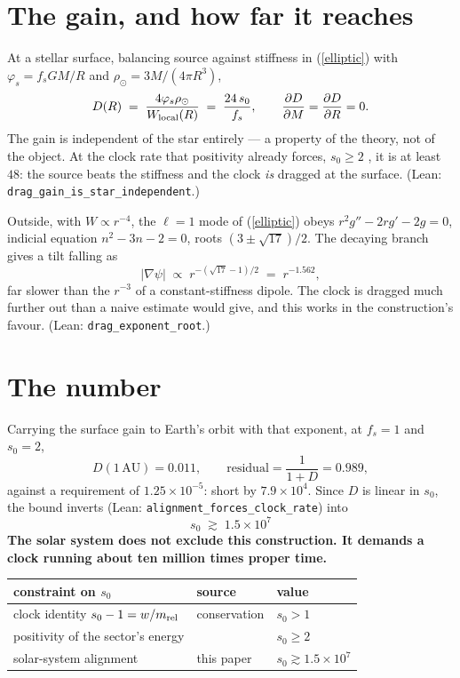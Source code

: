 \documentclass[11pt,letterpaper]{article}
\begin{document}
\section{The gain, and how far it reaches}
At a stellar surface, balancing source against stiffness in (\ref{elliptic}) with $\varphi_s=f_sGM/R$ and $\rho_\odot=3M/(4\pi R^3)$,
\begin{equation}
D(R)\;=\;\frac{4\varphi_s\rho_\odot}{W_{\rm local}(R)}\;=\;\frac{24\,s_0}{f_s},\qquad \frac{\partial D}{\partial M}=\frac{\partial D}{\partial R}=0 .
\end{equation}
The gain is independent of the star entirely --- a property of the theory, not of the object. At the clock rate that positivity already forces, $s_0\ge2$ \cite{paper24}, it is at least $48$: the source beats the stiffness and the clock \emph{is} dragged at the surface. (Lean: \texttt{drag\_gain\_is\_star\_independent}.)

Outside, with $W\propto r^{-4}$, the $\ell=1$ mode of (\ref{elliptic}) obeys $r^2g''-2rg'-2g=0$, indicial equation $n^2-3n-2=0$, roots $(3\pm\sqrt{17})/2$. The decaying branch gives a tilt falling as
\begin{equation}
|\nabla\psi|\;\propto\;r^{-(\sqrt{17}-1)/2}\;=\;r^{-1.562},
\end{equation}
far slower than the $r^{-3}$ of a constant-stiffness dipole. The clock is dragged much further out than a naive estimate would give, and this works in the construction's favour. (Lean: \texttt{drag\_exponent\_root}.)

\section{The number}
Carrying the surface gain to Earth's orbit with that exponent, at $f_s=1$ and $s_0=2$,
\begin{equation}
D(1\,\text{AU})=0.011,\qquad \text{residual}=\frac{1}{1+D}=0.989 ,
\end{equation}
against a requirement of $1.25\times10^{-5}$: short by $7.9\times10^4$. Since $D$ is linear in $s_0$, the bound inverts (Lean: \texttt{alignment\_forces\_clock\_rate}) into
\begin{equation}
\boxed{\;s_0\;\gtrsim\;1.5\times10^{7}\;}
\end{equation}
\textbf{The solar system does not exclude this construction. It demands a clock running about ten million times proper time.}

\begin{center}
\begin{tabular}{lll}
\toprule
constraint on $s_0$ & source & value \\
\midrule
clock identity $s_0-1=w/m_{\rm rel}$ & conservation \cite{paper21} & $s_0>1$ \\
positivity of the sector's energy & \cite{paper24} & $s_0\ge2$ \\
solar-system alignment & this paper & $s_0\gtrsim1.5\times10^7$ \\
\bottomrule
\end{tabular}
\end{center}
\end{document}
